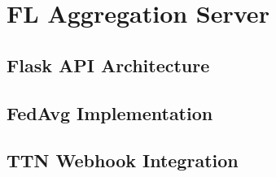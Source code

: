 \section{FL Aggregation Server}
\label{sec:server-design}

\subsection{Flask API Architecture}

\subsection{FedAvg Implementation}

\subsection{TTN Webhook Integration}
